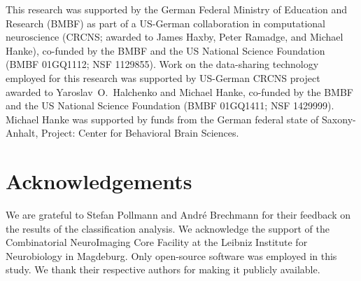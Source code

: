 \documentclass[10pt,a4paper,twocolumn]{article}
\begin{document}
This research was supported by the German Federal Ministry of Education and
Research (BMBF) as part of a US-German collaboration in computational
neuroscience (CRCNS; awarded to James Haxby, Peter Ramadge, and Michael Hanke),
co-funded by the BMBF and the US National Science Foundation (BMBF 01GQ1112;
NSF 1129855). Work on the data-sharing technology employed for this research
was supported by US-German CRCNS project awarded to Yaroslav~O.~Halchenko and
Michael Hanke, co-funded by the BMBF and the US National Science Foundation
(BMBF 01GQ1411; NSF 1429999).  Michael Hanke was supported by funds from the
German federal state of Saxony-Anhalt, Project: Center for Behavioral Brain
Sciences.

\section*{Acknowledgements}

We are grateful to Stefan Pollmann and Andr\'e Brechmann for their feedback on
the results of the classification analysis.
%
We acknowledge the support of the Combinatorial NeuroImaging Core
Facility at the Leibniz Institute for Neurobiology in Magdeburg.
%
Only open-source software was employed in this study. We thank their respective
authors for making it publicly available.
\end{document}
